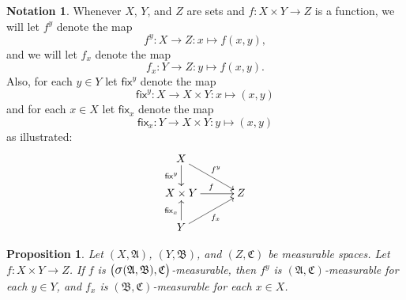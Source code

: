 \documentclass[
twoside=true,
paper=letter,
fontsize=9pt,
pagesize=auto,
leqno,
openany,
headsepline,
overfullrule,
]{scrbook}
\theoremstyle{plain}
\theoremstyle{plain}
\newtheorem{prop}[thm]{Proposition}
\theoremstyle{definition}
\newtheorem{notn}[thm]{Notation}
\theoremstyle{bfnoteitalic}
\theoremstyle{bfnoteroman}
\newcommand{\sigalg}[1]{\mathfrak{#1}}
\newcommand{\sfop}[1]{\mathsf{#1}}
\newcommand{\sagb}{\mathop{\hbox{\large{$\sigma$}}}\nolimits}
\newcommand{\sigmaalgebra}{\sigalg{A}}
\newcommand{\sigmaalgebraii}{\sigalg{B}}
\newcommand{\sigmaalgebraiii}{\sigalg{C}}
\newcommand{\productsig}[2]{\sagb(#1,#2)}
\newcommand{\function}{f}
\newcommand{\measurespace}{X}
\newcommand{\measurespaceii}{Y}
\newcommand{\measurespaceiii}{Z}
\newcommand{\mspaceelt}{x}
\newcommand{\mspaceeltii}{y}
\newcommand{\fixinthefirst}[1]{\sfop{fix}_{#1}}
\newcommand{\fixinthesecond}[1]{\sfop{fix}^{#1}}
\begin{document}
\begin{notn}
Whenever $\measurespace$, $\measurespaceii$, and 
$\measurespaceiii$ are sets and 
$\function
:\measurespace\times\measurespaceii\to\measurespaceiii$ is a function, we will let 
$\function^\mspaceeltii$ denote the map
\[
\function^\mspaceeltii
:\measurespace\to\measurespaceiii: 
\mspaceelt \mapsto \function(\mspaceelt,\mspaceeltii),
\]
and we will let $\function_\mspaceelt$ denote the map
\[
\function_\mspaceelt
:\measurespaceii\to\measurespaceiii: 
\mspaceeltii \mapsto \function(\mspaceelt,\mspaceeltii).
\]
Also, for each $\mspaceeltii\in\measurespaceii$ let
$\fixinthesecond{\mspaceeltii}$ denote the map
\[
\fixinthesecond{\mspaceeltii}
:\measurespace\to\measurespace\times\measurespaceii
:\mspaceelt\mapsto (\mspaceelt,\mspaceeltii)
\]
and for each $\mspaceelt\in\measurespace$ let
$\fixinthefirst{\mspaceelt}$ denote the map
\[
\fixinthefirst{\mspaceelt}
:\measurespaceii\to\measurespace\times\measurespaceii
:\mspaceeltii\mapsto (\mspaceelt,\mspaceeltii)
\]
as illustrated:
\[
\xymatrix@R=18pt@C=30pt{ 
\measurespace \ar[d]_-{\fixinthesecond{\mspaceeltii}}
\ar[dr]^{\function^\mspaceeltii}
\\
\measurespace\times \measurespaceii
\ar[r]^{\function} & \measurespaceiii
\\
\measurespaceii
\ar[ur]_{\function_\mspaceelt}
\ar[u]^{\fixinthefirst{\mspaceelt}} & \\
}
\]
\end{notn}
 
 
 \begin{prop}\label{measurable_out_of_product}
Let 
$(\measurespace,\sigmaalgebra)$,
$(\measurespaceii,\sigmaalgebraii)$, and
$(\measurespaceiii,\sigmaalgebraiii)$
be measurable spaces. 
Let 
$\function
:\measurespace\times\measurespaceii\to\measurespaceiii$.
If $\function$ is 
$\bigl(
\productsig{\sigmaalgebra}{\sigmaalgebraii},
\sigmaalgebraiii
\bigr)$\hyp{}measurable, then
$\function^\mspaceeltii$ is 
$(\sigmaalgebra,\sigmaalgebraiii)$\hyp{}measurable for each 
$\mspaceeltii\in\measurespaceii$, and
$\function_\mspaceelt$ is
$(\sigmaalgebraii,\sigmaalgebraiii)$\hyp{}measurable for each 
$\mspaceelt\in\measurespace$.
\end{prop}
 
\end{document}
